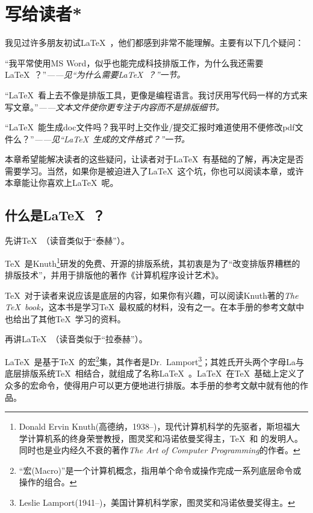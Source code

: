 \chapter{\mbox{写给读者}*}

我见过许多朋友初试\LaTeX\ ，他们都感到非常不能理解。主要有以下几个疑问：
\begin{feae}
\item “我平常使用MS Word，似乎也能完成科技排版工作，为什么我还需要\LaTeX\ ？”\hfill \textit{——见“为什么需要\LaTeX\ ？”一节。}
\item “\LaTeX\ 看上去不像是排版工具，更像是编程语言。我讨厌用写代码一样的方式来写文章。”\hfill \textit{——文本文件使你更专注于内容而不是排版细节。}
\item “\LaTeX\ 能生成doc文件吗？我平时上交作业/提交汇报时难道使用不便修改pdf文件么？”\hfill \textit{——见“\LaTeX\ 生成的文件格式？”一节。}
\end{feae}

本章希望能解决读者的这些疑问，让读者对于\LaTeX\ 有基础的了解，再决定是否需要学习。当然，如果你是被迫进入了\LaTeX\ 这个坑，你也可以阅读本章，或许本章能让你喜欢上\LaTeX\ 呢。

\section{什么是\LaTeX\ ？}
先讲\TeX\ （读音类似于“泰赫”）。

\TeX\ 是Knuth\footnote{Donald Ervin Knuth(高德纳，1938--)，现代计算机科学的先驱者，斯坦福大学计算机系的终身荣誉教授，图灵奖和冯诺依曼奖得主，\TeX\ 和  的发明人。同时也是业内经久不衰的著作\emph{The Art of Computer Programming}的作者。}研发的免费、开源的排版系统，其初衷是为了“改变排版界糟糕的排版技术”，并用于排版他的著作《计算机程序设计艺术》。

\TeX\ 对于读者来说应该是底层的内容，如果你有兴趣，可以阅读Knuth著的\emph{The \TeX\ book}，这本书是学习\TeX\ 最权威的材料，没有之一。在本手册的参考文献中也给出了其他\TeX\ 学习的资料。\dpar

再讲\LaTeX\ （读音类似于“拉泰赫”）。

\LaTeX\ 是基于\TeX\ 的宏\footnote{“宏(Macro)”是一个计算机概念，指用单个命令或操作完成一系列底层命令或操作的组合。}集，其作者是Dr.~Lamport\footnote{Leslie Lamport(1941--)，美国计算机科学家，图灵奖和冯诺依曼奖得主。}；其姓氏开头两个字母La与底层排版系统\TeX\ 相结合，就组成了名称\LaTeX\ 。\LaTeX\ 在\TeX\ 基础上定义了众多的宏命令，使得用户可以更方便地进行排版。本手册的参考文献中就有他的作品。

